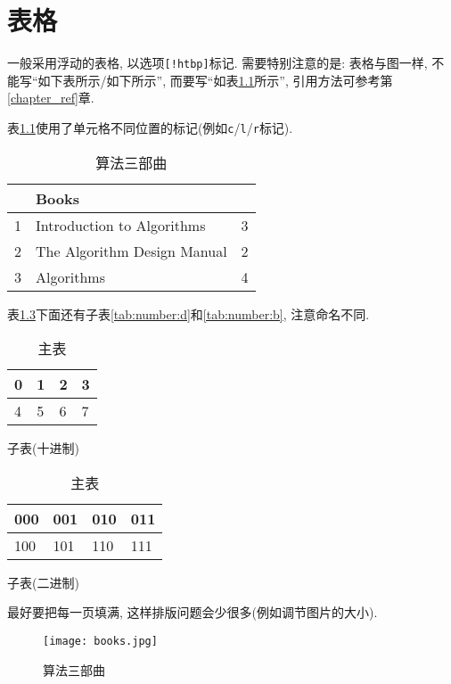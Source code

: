 \chapter{表格}


  一般采用浮动的表格, 以选项\texttt{[!htbp]}标记. 需要特别注意的是: 表格与图一样, 不能写``如下表所示/如下所示'', 而要写``如表\ref{tab:trilogy}所示'', 引用方法可参考第\ref{chapter_ref}章.


  表\ref{tab:trilogy}使用了单元格不同位置的标记(例如\texttt{c}/\texttt{l}/\texttt{r}标记).

\begin{table}[!hbtp]
\centering
\begin{tabular}{|c|l|r|}
\hline
    & Books                         &     \\ \hline
1   & Introduction to Algorithms    & 3 \\
2   & The Algorithm Design Manual   & 2 \\
3   & Algorithms                    & 4 \\
\hline
\end{tabular}
\caption{算法三部曲}
\label{tab:trilogy}
\end{table}


  表\ref{tab:number}下面还有子表\ref{tab:number:d}和\ref{tab:number:b}, 注意命名不同.

\begin{table}[!htb]
\centering
\begin{subtable}[t]{2in}
  \centering
  \begin{tabular}{|l|l|l|l|}
  \hline
  0 & 1 & 2 & 3 \\
  \hline
  4 & 5 & 6 & 7 \\
  \hline
  \end{tabular}
  \caption{子表(十进制)}\label{tab:number:d}
\end{subtable}
\quad
\begin{subtable}[t]{2in}
  \centering
  \begin{tabular}{|l|l|l|l|}
  \hline
  000 & 001 & 010 & 011 \\
  \hline
  100 & 101 & 110 & 111 \\
  \hline
  \end{tabular}
  \caption{子表(二进制)}\label{tab:number:b}
\end{subtable}
\caption{主表}
\label{tab:number}
\end{table}

最好要把每一页填满, 这样排版问题会少很多(例如调节图片的大小).

\begin{figure}[h]
    \centering
    \texttt{[image: books.jpg]}
    \caption{算法三部曲}
\end{figure}
